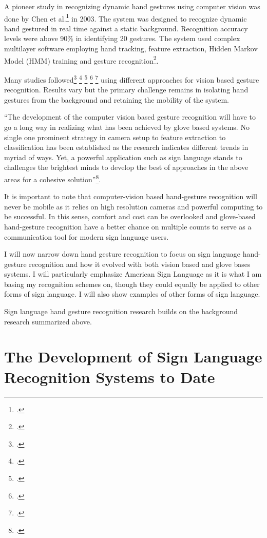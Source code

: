 A pioneer study in recognizing dynamic hand gestures using computer vision was done by Chen et al.\footcite{Chen2003} in 2003. The system was designed to recognize dynamic hand gestured in real time against a static background. Recognition accuracy levels were above 90\% in identifying 20 gestures. The system used complex multilayer software employing hand tracking, feature extraction, Hidden Markov Model (HMM) training and gesture recognition\footcite{Chen2003}. 

Many studies followed\footcite{GastaldiG.PareschiA.SabatiniS.SolariF.Bisio2005} \footcite{Premaratne2007} \footcite{Binh2005} \footcite{Binh2006} \footcite{Berci2007} using different approaches for vision based gesture recognition. Results vary but the primary challenge remains in isolating hand gestures from the background and retaining the mobility of the system. 


``The development of the computer vision based gesture recognition will have to go a long way in realizing what has been achieved by glove based systems. No single one prominent strategy in camera setup to feature extraction to classification has been established as the research indicates different trends in myriad of ways. Yet, a powerful application such as sign language stands to challenges the brightest minds to develop the best of approaches in the above areas for a cohesive solution''\footcite{Premaratne2010}. 

It is important to note that computer-vision based hand-gesture recognition will never be mobile as it relies on high resolution cameras and powerful computing to be successful. In this sense, comfort and cost can be overlooked and glove-based hand-gesture recognition have a better chance on multiple counts to serve as a communication tool for modern sign language users. 

I will now narrow down hand gesture recognition to focus on sign language hand-gesture recognition and how it evolved with both vision based and glove bases systems. I will particularly emphasize American Sign Language as it is what I am basing my recognition schemes on, though they could equally be applied to other forms of sign language. I will also show examples of other forms of sign language. 

Sign language hand gesture recognition research builds on the background research summarized above. 


\section{The Development of Sign Language Recognition Systems to Date}

